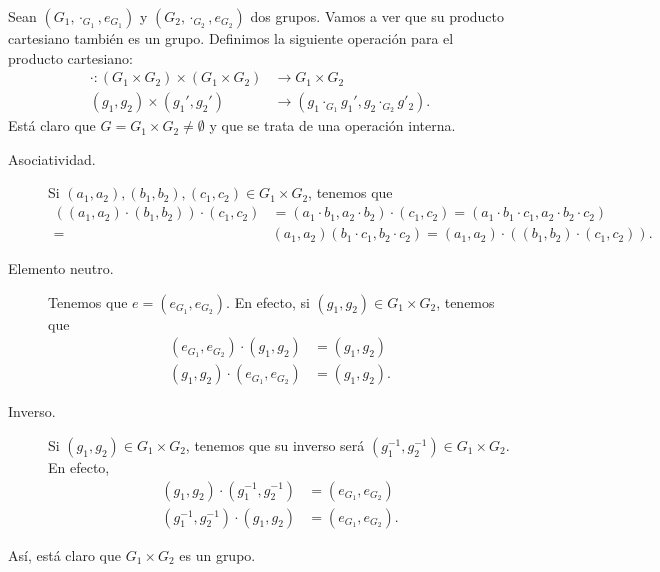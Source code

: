 \begin{eg}
Sean $\displaystyle \left(G_{1}, \cdot _{G_{1}}, e_{G_{1}}\right) $ y $\displaystyle \left(G_{2}, \cdot _{G_{2}}, e_{G_{2}}\right) $ dos grupos. Vamos a ver que su producto cartesiano también es un grupo. Definimos la siguiente operación para el producto cartesiano:
\[
\begin{split}
	\cdot : (G_{1} \times G_{2}) \times \left(G_{1} \times G_{2}\right) & \to G_{1} \times G_{2} \\
	\left(g_{1}, g_{2}\right) \times \left(g_{1}', g_{2}'\right) & \to \left(g_{1} \cdot _{G_{1}}g_{1}', g_{2} \cdot _{G_{2}}g'_{2}\right).
\end{split}
\]
Está claro que $\displaystyle G = G_{1}\times G_{2} \neq \emptyset $ y que se trata de una operación interna. 
\begin{description}
\item[Asociatividad.] Si $\displaystyle \left(a_{1}, a_{2}\right), \left(b_{1}, b_{2}\right) , \left(c_{1}, c_{2}\right) \in G_{1} \times G_{2}$, tenemos que
	\[
	\begin{split}
		\left(\left(a_{1}, a_{2}\right) \cdot \left(b_{1}, b_{2}\right)\right) \cdot \left(c_{1}, c_{2}\right) & = \left(a_{1} \cdot b_{1}, a_{2} \cdot b_{2}\right) \cdot \left(c_{1},c_{2}\right) = \left(a_{1} \cdot b_{1} \cdot c_{1}, a_{2} \cdot b_{2} \cdot c_{2}\right) \\
		= & \left(a_{1}, a_{2}\right) \left(b_{1} \cdot c_{1}, b_{2} \cdot c_{2}\right) = \left(a_{1}, a_{2}\right) \cdot \left(\left(b_{1}, b_{2}\right) \cdot \left(c_{1}, c_{2}\right)\right).
	\end{split}
	\]
\item[Elemento neutro.] Tenemos que $\displaystyle e = \left(e_{G_{1}}, e_{G_{2}}\right) $. En efecto, si $\displaystyle \left(g_{1}, g_{2}\right) \in G_{1} \times G_{2} $, tenemos que
	\[
	\begin{split}
		\left(e_{G_{1}}, e_{G_{2}}\right) \cdot \left(g_{1}, g_{2}\right) & = \left(g_{1}, g_{2}\right) \\
		\left(g_{1}, g_{2}\right) \cdot \left(e_{G_{1}}, e_{G_{2}}\right) & = \left(g_{1}, g_{2}\right).
	\end{split}
	\]
\item[Inverso.] Si $\displaystyle \left(g_{1}, g_{2}\right) \in G_{1} \times G_{2} $, tenemos que su inverso será $\displaystyle \left(g_{1}^{-1}, g_{2}^{-1}\right) \in G_{1} \times G_{2} $. En efecto,
	\[
	\begin{split}
		\left(g_{1}, g_{2}\right) \cdot \left(g_{1}^{-1}, g_{2}^{-1}\right) & = \left(e_{G_{1}}, e_{G_{2}}\right) \\
		\left(g_{1}^{-1}, g_{2}^{-1}\right) \cdot \left(g_{1}, g_{2}\right) & = \left(e_{G_{1}}, e_{G_{2}}\right).
	\end{split}
	\]
\end{description}
Así, está claro que $\displaystyle G_{1} \times G_{2} $ es un grupo.	
\end{eg}

